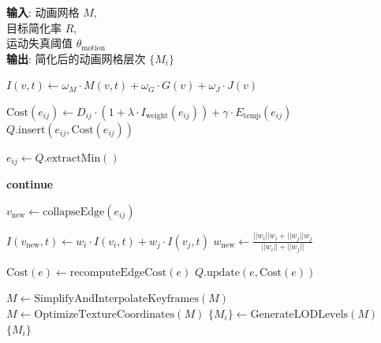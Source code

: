 \begin{algorithm}[htbp]
\caption{时空运动特征驱动的动画网格层次简化算法}
\label{alg:spatiotemporal-motion-simplification}
\textbf{输入}: 动画网格 $M$, \\
\hspace*{2.4em} 目标简化率 $R$, \\
\hspace*{2.4em} 运动失真阈值 $\theta_{\text{motion}}$ \\
\textbf{输出}: 简化后的动画网格层次 $\{M_i\}$
\begin{algorithmic}[1]
        \State $I(v,t) \gets \omega_M \cdot M(v,t) + \omega_G \cdot G(v) + \omega_J \cdot J(v)$ 
    \EndFor
    
        \State $\text{Cost}(e_{ij}) \gets D_{ij} \cdot (1 + \lambda \cdot I_{\text{weight}}(e_{ij})) + \gamma \cdot E_{\text{temp}}(e_{ij})$ 
        \State $Q.\text{insert}(e_{ij}, \text{Cost}(e_{ij}))$
    \EndFor
    
        \State $e_{ij} \gets Q.\text{extractMin}()$
        
            \State \textbf{continue} 
        \EndIf
        
        \State $v_{\text{new}} \gets \text{collapseEdge}(e_{ij})$ 
        
        \State $I(v_{\text{new}}, t) \gets w_i \cdot I(v_i, t) + w_j \cdot I(v_j, t)$ 
        \State $w_{\text{new}} \gets \frac{||w_i|| w_i + ||w_j|| w_j}{||w_i|| + ||w_j||}$ 
        
            \State $\text{Cost}(e) \gets \text{recomputeEdgeCost}(e)$ 
            \State $Q.\text{update}(e, \text{Cost}(e))$
        \EndFor
    \EndWhile
    
    \State $M \gets \text{SimplifyAndInterpolateKeyframes}(M)$ 
    \State $M \gets \text{OptimizeTextureCoordinates}(M)$ 
    \State $\{M_i\} \gets \text{GenerateLODLevels}(M)$ 
    \State \Return $\{M_i\}$
\end{algorithmic}
\end{algorithm}


